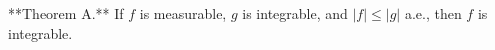 **Theorem A.** If $f$ is measurable, $g$ is integrable, and $|f| \leq |g|$ a.e., then $f$ is integrable.
